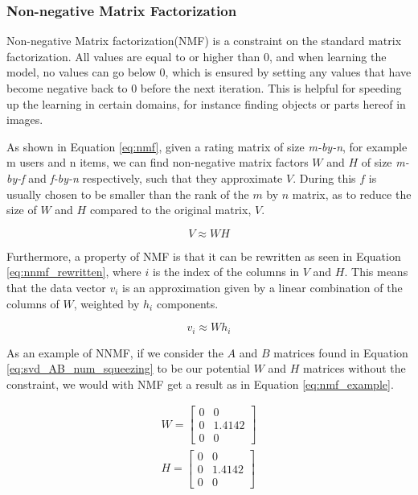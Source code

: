 \subsubsection{Non-negative Matrix Factorization}

Non-negative Matrix factorization(NMF) is a constraint on the standard matrix factorization. All values are equal to or higher than 0, and when learning the model, no values can go below 0, which is ensured by setting any values that have become negative back to 0 before the next iteration. This is helpful for speeding up the learning in certain domains, for instance finding objects or parts hereof in images\cite{nnmf}.

As shown in Equation \ref{eq:nmf}, given a rating matrix of size \textit{m-by-n}, for example m users and n items, we can find non-negative matrix factors $W$ and $H$ of size \textit{m-by-f} and \textit{f-by-n} respectively, such that they approximate $V$. During this $f$ is usually chosen to be smaller than the rank of the $m$ by $n$ matrix, as to reduce the size of $W$ and $H$ compared to the original matrix, $V$\cite{LeeNMF}.

\begin{equation} \label{eq:nmf}
	V \approx W H
\end{equation}

Furthermore, a property of NMF is that it can be rewritten as seen in Equation \ref{eq:nnmf_rewritten}, where $i$ is the index of the columns in $V$ and $H$. This means that the data vector $v_{i}$ is an approximation given by a linear combination of the columns of $W$, weighted by $h_{i}$ components\cite{LeeNMF}.

\begin{equation} \label{eq:nnmf_rewritten}
	v_{i} \approx W h_{i}
\end{equation}

As an example of NNMF, if we consider the $A$ and $B$ matrices found in Equation \ref{eq:svd_AB_num_squeezing} to be our potential $W$ and $H$ matrices without the constraint, we would with NMF get a result as in Equation \ref{eq:nmf_example}.

\begin{equation}\label{eq:nmf_example}
\begin{split}
W =
\begin{bmatrix}
0 & 0\\
0 & 1.4142\\
0 & 0
\end{bmatrix}
\\
H = 
\begin{bmatrix}
0 & 0\\
0 & 1.4142\\
0 & 0
\end{bmatrix}
\end{split}
\end{equation}